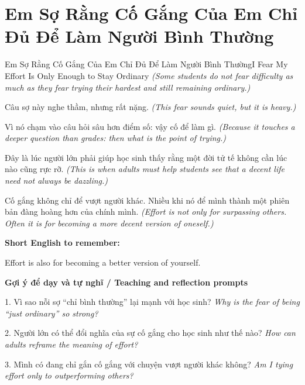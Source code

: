 \section{Em Sợ Rằng Cố Gắng Của Em Chỉ Đủ Để Làm Người Bình Thường}
\begin{truyen}{Em Sợ Rằng Cố Gắng Của Em Chỉ Đủ Để Làm Người Bình Thường}{I Fear My Effort Is Only Enough to Stay Ordinary}
\textit{(Some students do not fear difficulty as much as they fear trying their hardest and still remaining ordinary.)}

Câu sợ này nghe thầm, nhưng rất nặng.
\textit{(This fear sounds quiet, but it is heavy.)}

Vì nó chạm vào câu hỏi sâu hơn điểm số: vậy cố để làm gì.
\textit{(Because it touches a deeper question than grades: then what is the point of trying.)}

Đây là lúc người lớn phải giúp học sinh thấy rằng một đời tử tế không cần lúc nào cũng rực rỡ.
\textit{(This is when adults must help students see that a decent life need not always be dazzling.)}

\end{truyen}

\begin{baihoc}
Cố gắng không chỉ để vượt người khác. Nhiều khi nó để mình thành một phiên bản đàng hoàng hơn của chính mình.
\textit{(Effort is not only for surpassing others. Often it is for becoming a more decent version of oneself.)}
\end{baihoc}

\begin{ghinhoanh}
\textbf{Short English to remember:}

Effort is also for becoming a better version of yourself.

\end{ghinhoanh}

\begin{tuhocnhanh}
\textbf{Gợi ý để dạy và tự nghĩ / Teaching and reflection prompts}

1. Vì sao nỗi sợ “chỉ bình thường” lại mạnh với học sinh? \textit{Why is the fear of being “just ordinary” so strong?}

2. Người lớn có thể đổi nghĩa của sự cố gắng cho học sinh như thế nào? \textit{How can adults reframe the meaning of effort?}

3. Mình có đang chỉ gắn cố gắng với chuyện vượt người khác không? \textit{Am I tying effort only to outperforming others?}
\end{tuhocnhanh}
\ngancach

